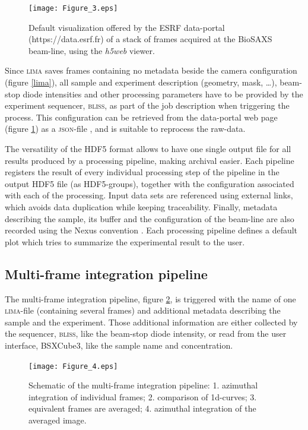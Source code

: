 \documentclass[preprint]{iucr}              %
\begin{document}
\begin{figure}
     \caption{Default visualization offered by the ESRF data-portal (https://data.esrf.fr) of a stack of frames acquired at the BioSAXS beam-line, using the \textit{h5web} viewer.}
     \texttt{[image: Figure\_3.eps]}
     \label{dataportal}
\end{figure}

Since \textsc{lima} saves frames containing no metadata beside the camera configuration (figure \ref{lima}), all sample and experiment description (geometry, mask, \ldots), beam-stop diode intensities and other processing parameters have to be provided by the experiment sequencer, \textsc{bliss}, as part of the job description when triggering the process. 
This configuration can be retrieved from the data-portal web page (figure \ref{dataportal}) as a \textsc{json}-file \cite{json}, and is suitable to reprocess the raw-data.

The versatility of the HDF5 format allows to have one single output file for all results produced by a processing pipeline, making archival easier.
Each pipeline registers the result of every individual processing step of the pipeline in the output HDF5 file (as HDF5-groups), together with the configuration associated with each of the processing.
Input data sets are referenced using external links, which avoids data duplication while keeping traceability. 
Finally, metadata describing the sample, its buffer and the configuration of the beam-line are also recorded using the Nexus convention \cite{nexus}.
Each processing pipeline defines a default plot which tries to summarize the experimental result to the user.

\subsection{Multi-frame integration pipeline}
\label{multiframe_pipeline}
The multi-frame integration pipeline, figure \ref{multiframe_worflow}, is triggered with the name of one \textsc{lima}-file (containing several frames) and additional metadata describing the sample and the experiment.
Those additional information are either collected by the sequencer, \textsc{bliss}, like the beam-stop diode intensity, or read from the user interface, BSXCube3, like the sample name and concentration.

\begin{figure}
     \label{multiframe_worflow}
     \begin{center} 
     \caption{Schematic of the multi-frame integration pipeline: 
     1. azimuthal integration of individual frames; 
     2. comparison of 1d-curves;
     3. equivalent frames are averaged;
     4. azimuthal integration of the averaged image.}
     \texttt{[image: Figure\_4.eps]}
     \end{center}
\end{figure}
\end{document}
